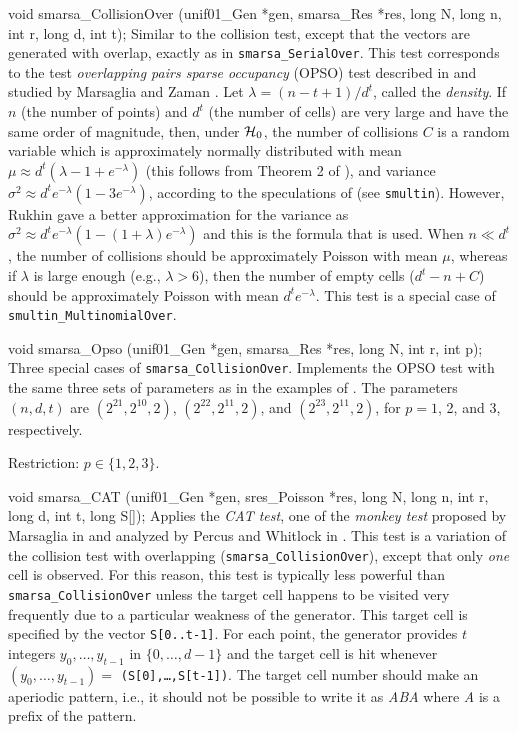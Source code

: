 void smarsa_CollisionOver (unif01_Gen *gen, smarsa_Res *res,
                           long N, long n, int r, long d, int t);
\endcode
  \tab
  Similar to the collision test, except
  that the vectors are generated
  with overlap, exactly as in {\tt smarsa\_SerialOver}.
  This test corresponds to the test {\em overlapping pairs sparse 
  occupancy\/} (OPSO) test described in \cite {rMAR85a} and studied by 
  Marsaglia and Zaman \cite{rMAR93a}.
  Let $\lambda = (n-t+1)/d^t$, called the {\em density}.
  If $n$ (the number of points) and $d^t$ (the number of cells)
  are very large and have the same order of magnitude,
  then,  under $\mathcal{H}_0$, 
  the number of collisions $C$ is a random variable which is 
  approximately normally distributed with mean 
  $\mu \approx d^t (\lambda - 1 + e^{-\lambda})$
  (this follows from Theorem 2 of \cite{rPER95a}),
  and variance $\sigma^2 \approx d^t e^{-\lambda}(1-3e^{-\lambda})$,
  according to the speculations of \cite{rMAR93a} (see {\tt smultin}).
  However, Rukhin \cite{rRUK02a} gave a better approximation for the variance as 
  $\sigma^2 \approx d^t e^{-\lambda}(1-(1+\lambda) e^{-\lambda})$ and this
  is the formula that is used.
  When $n \ll d^t$, the number of collisions should be
  approximately Poisson with mean $\mu$,
  whereas if $\lambda$ is large enough (e.g., $\lambda> 6$), then the
  number of empty cells ($d^t - n + C$)
  should be  approximately Poisson with mean $d^t e^{-\lambda}$.
  This test is a special case of {\tt smultin\_MultinomialOver}.
 \endtab
\code


void smarsa_Opso (unif01_Gen *gen, smarsa_Res *res,
                  long N, int r, int p);
\endcode
 \tab
   Three special cases of {\tt smarsa\_CollisionOver}.
   Implements the OPSO
   test with the same three sets of parameters
   as in the examples
   of \cite{rMAR85a}. 
   The parameters $(n, d, t)$ are $(2^{21}, 2^{10}, 2)$, 
   $(2^{22}, 2^{11}, 2)$, 
   and  $(2^{23}, 2^{11}, 2)$, for $p = 1$, 2, and 3, respectively.

   Restriction: $p\in \{1, 2, 3\}$.
 \endtab
\code


void smarsa_CAT (unif01_Gen *gen, sres_Poisson *res,
                 long N, long n, int r, long d, int t, long S[]);
\endcode
\tab
 Applies the {\em CAT test\/}, one of the {\em monkey test\/} proposed by 
 Marsaglia in \cite{rMAR93b} and analyzed by Percus and Whitlock in 
 \cite{rPER95a}.
 This test is a variation of the collision test with overlapping
 ({\tt smarsa\_CollisionOver}), except that only {\em one\/} cell is
 observed. For this reason, this test is typically less powerful than
 {\tt smarsa\_CollisionOver} unless the target cell happens to be visited 
 very frequently due to a particular weakness of the generator. 
 This target cell is specified by the vector {\tt S[0..t-1]}.
 For each point, the generator provides $t$ integers 
 $y_0,\dots,y_{t-1}$ in $\{0,\dots,d-1\}$ and the target cell is hit
 whenever $(y_0, \dots, y_{t-1}) =$ {\tt (S[0],\dots,S[t-1])}. The
 target cell number should make an aperiodic pattern, i.e., it should not
 be possible to write it as {\em ABA} where {\em A} is a prefix of the
 pattern.

